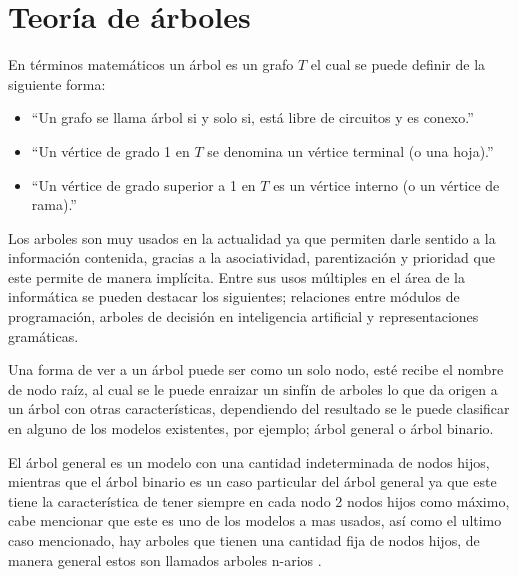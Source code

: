 \section{Teoría de árboles}
En términos matemáticos un árbol es un grafo $T$ el cual se puede definir de
 la siguiente forma\cite{SUSANNAS.EPP2012}:

\begin{itemize}
	\item ``Un grafo se llama árbol si y solo si, está libre de circuitos y
	 es conexo.''
	\item ``Un vértice de grado 1 en $T$ se denomina un vértice terminal (o
	 una hoja).''
	\item ``Un vértice de grado superior a 1 en $T$ es un vértice interno (o
	 un vértice de rama).''
\end{itemize}

Los arboles son muy usados en la actualidad ya que permiten  darle sentido a
 la información contenida, gracias a la asociatividad, parentización y
 prioridad que este permite de manera implícita. Entre sus usos múltiples en
 el área de la informática se pueden destacar los  siguientes; relaciones
 entre módulos de programación, arboles de decisión en inteligencia artificial
 y representaciones gramáticas\cite{gutierrez1999estructuras}.  

Una forma de ver a un árbol puede ser como un solo nodo, esté recibe el nombre
 de  nodo raíz, al cual se le puede enraizar un sinfín de arboles lo que da
 origen  a un árbol con otras características, dependiendo del resultado se le
 puede clasificar en alguno de los modelos existentes, por ejemplo; árbol 
 general o árbol binario\cite{gutierrez1999estructuras}. 

El árbol general es un modelo con una cantidad indeterminada de nodos hijos,
 mientras que el árbol binario es un caso particular del árbol general ya que
 este tiene la característica de tener siempre en cada nodo 2 nodos hijos como
 máximo, cabe mencionar que este es uno de los modelos a mas usados, así como
 el ultimo caso mencionado, hay arboles que tienen una cantidad fija de nodos
 hijos, de manera general estos son llamados arboles n-arios
 \cite{gutierrez1999estructuras}.